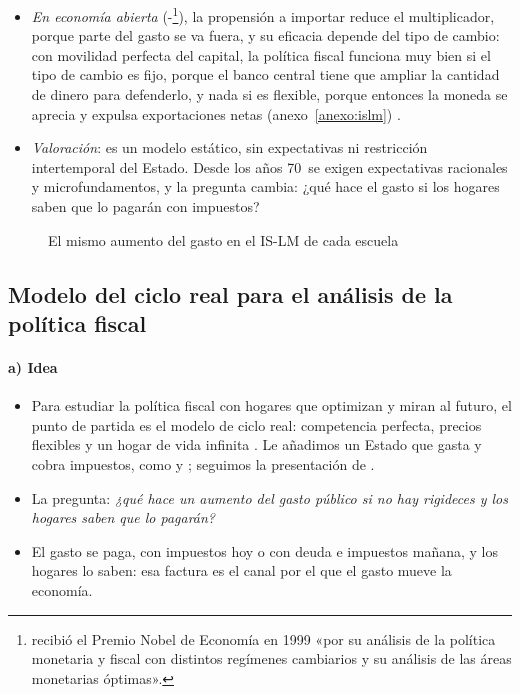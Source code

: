 \documentclass[11pt]{article}
\begin{document}
\begin{itemize}
\begin{itemize}
  \end{itemize}
\item \emph{En economía abierta} (-\footnote{ recibió el Premio Nobel de Economía en 1999 «por su análisis de la política monetaria y fiscal con distintos regímenes cambiarios y su análisis de las áreas monetarias óptimas»\nocite{Nobel1999Mundell}.}), la propensión a importar reduce el multiplicador, porque parte del gasto se va fuera, y su eficacia depende del tipo de cambio: con movilidad perfecta del capital, la política fiscal funciona muy bien si el tipo de cambio es fijo, porque el banco central tiene que ampliar la cantidad de dinero para defenderlo, y nada si es flexible, porque entonces la moneda se aprecia y expulsa exportaciones netas (anexo~\ref{anexo:islm}) .
\item \emph{Valoración}: es un modelo estático, sin expectativas ni restricción intertemporal del Estado. Desde los años 70~se exigen expectativas racionales y microfundamentos, y la pregunta cambia: ¿qué hace el gasto si los hogares saben que lo pagarán con impuestos?
\end{itemize}

\begin{figure}[H]
\centering
\caption{El mismo aumento del gasto en el IS-LM de cada escuela}\label{fig:islm-escuelas}
\end{figure}

\subsection{Modelo del ciclo real para el análisis de la política fiscal}\label{sec:rbc-fiscal}

\paragraph{a) Idea}

\begin{itemize}
\item Para estudiar la política fiscal con hogares que optimizan y miran al futuro, el punto de partida es el modelo de ciclo real: competencia perfecta, precios flexibles y un hogar de vida infinita . Le añadimos un Estado que gasta y cobra impuestos, como \textcite{ChristianoEichenbaum1992Current} y \textcite{BaxterKing1993Fiscal}; seguimos la presentación de \textcite{Sims2017Fiscal}.
\item La pregunta: \emph{¿qué hace un aumento del gasto público si no hay rigideces y los hogares saben que lo pagarán?}
\item El gasto se paga, con impuestos hoy o con deuda e impuestos mañana, y los hogares lo saben: esa factura es el canal por el que el gasto mueve la economía.
\end{itemize}
\end{document}
